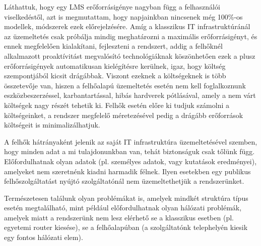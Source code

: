 Láthattuk, hogy egy LMS erőforrásigénye nagyban függ a felhasználói viselkedéstől, azt is megmutattam, hogy napjainkban nincsenek még 100\%-os modellek, módszerek ezek előrejelzésére. Amíg a klasszikus IT infrastruktúránál az üzemeltetés csak próbálja mindig meghatározni a maximális erőforrásigényt, és ennek megfelelően kialakítani, fejleszteni a rendszert, addig a felhőknél alkalmazott proaktívitást megvalósító technológiáknak köszönhetően ezek a plusz erőforrásigények automatikusan kielégítésre kerülnek, igaz, hogy költség szempontjából kicsit drágábbak. Viszont ezeknek a költségeknek is több összetevője van, hiszen a felhőalapú üzemeltetés esetén nem kell foglalkoznunk eszközbeszerzéssel, karbantartással, hibás hardverek pótlásával, amely a nem várt költségek nagy részét tehetik ki. Felhők esetén előre ki tudjuk számolni a költségeinket, a rendszer megfelelő méretezésével pedig a drágább  erőforrások költségeit is minimalizálhatjuk.


A felhők hátrányaként jelenik az saját IT infrastruktúra üzemeltetésével szemben, hogy minden adat a mi tulajdonunkban van, tehát biztonságuk csak tőlünk függ. Előfordulhatnak olyan adatok (pl. személyes adatok, vagy kutatások eredményei), amelyeket nem szeretnénk kiadni harmadik félnek. Ilyen esetekben egy publikus felhőszolgáltatást nyújtó szolgáltatónál nem üzemeltethetjük a rendszerünket.


Természetesen találunk olyan problémákat is, amelyek mindkét struktúra típus esetén megtalálható, mint például előfordulhatnak olyan hálózati problémák, amelyek miatt a rendszerünk nem lesz elérhető se a klasszikus esetben (pl. egyetemi router kiesése), se a felhőalapúban (a szolgáltatónk telephelyén kiesik egy fontos hálózati elem).

